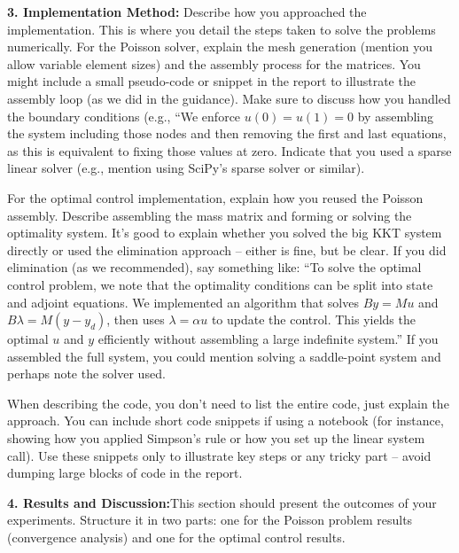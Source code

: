 \documentclass[a4paper,10pt]{report}
\begin{document}
\textbf{3. Implementation Method:}
Describe how you approached the implementation. This is where you detail the steps taken to solve the problems numerically. For the Poisson solver, explain the mesh generation (mention you allow variable element sizes) and the assembly process for the matrices. You might include a small pseudo-code or snippet in the report to illustrate the assembly loop (as we did in the guidance). Make sure to discuss how you handled the boundary conditions (e.g., “We enforce \(u(0)=u(1)=0\) by assembling the system including those nodes and then removing the first and last equations, as this is equivalent to fixing those values at zero.
Indicate that you used a sparse linear solver (e.g., mention using SciPy's sparse solver or similar).

For the optimal control implementation, explain how you reused the Poisson assembly. Describe assembling the mass matrix and forming or solving the optimality system. It's good to explain whether you solved the big KKT system directly or used the elimination approach – either is fine, but be clear. If you did elimination (as we recommended), say something like: “To solve the optimal control problem, we note that the optimality conditions can be split into state and adjoint equations. We implemented an algorithm that solves \(B y = M u\) and \(B \lambda = M(y - y_d)\), then uses \(\lambda = \alpha u\) to update the control. This yields the optimal \(u\) and \(y\) efficiently without assembling a large indefinite system.” If you assembled the full system, you could mention solving a saddle-point system and perhaps note the solver used.

When describing the code, you don't need to list the entire code, just explain the approach. You can include short code snippets if using a notebook (for instance, showing how you applied Simpson's rule or how you set up the linear system call). Use these snippets only to illustrate key steps or any tricky part – avoid dumping large blocks of code in the report.

\textbf{4. Results and Discussion:}This section should present the outcomes of your experiments. Structure it in two parts: one for the Poisson problem results (convergence analysis) and one for the optimal control results.
\end{document}
